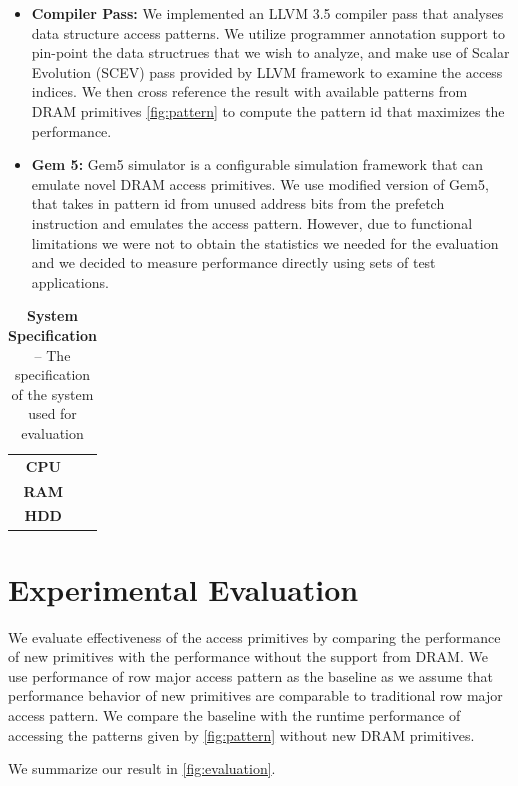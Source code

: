 \documentclass[letterpaper]{article}
\begin{document}
\begin{itemize}

  \item \textbf{Compiler Pass:} We implemented an LLVM 3.5 compiler pass that analyses data structure access patterns. We utilize programmer annotation support to pin-point the data structrues that we wish to analyze, and make use of Scalar Evolution (SCEV) pass provided by LLVM framework to examine the access indices. We then cross reference the result with available patterns from DRAM primitives \ref{fig:pattern} to compute the pattern id that maximizes the performance.
  \item \textbf{Gem 5:} Gem5 simulator is a configurable simulation framework that can emulate novel DRAM access primitives. We use modified version of Gem5, that takes in pattern id from unused address bits from the prefetch instruction and emulates the access pattern. However, due to functional limitations we were not to obtain the statistics we needed for the evaluation and we decided to measure performance directly using sets of test applications.
\end{itemize}


\begin{table}[t]
    \centering
    \begin{tabular}{c|c}
  \textbf{CPU} & \\
    \textbf{RAM} & \\
    \textbf{HDD} & \\

  \end{tabular}
    \caption{
        \textbf{System Specification} --
        The specification of the system used for evaluation
    }
    \label{tab:spec}
\end{table}

\section{Experimental Evaluation}

We evaluate effectiveness of the access primitives by comparing the performance of new primitives with the performance without the support from DRAM. We use performance of row major access pattern as the baseline as we assume that performance behavior of new primitives are comparable to traditional row major access pattern. We compare the baseline with the runtime performance of accessing the patterns given by \ref{fig:pattern} without new DRAM primitives.

We summarize our result in \ref{fig:evaluation}.
\end{document}
